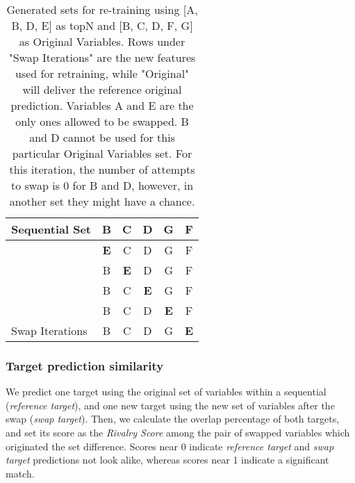 \begin{table}[!htbp]
{\begin{tabular}{l|c|c|c|c|c|}
\multicolumn{1}{|l|}{Sequential Set}                          & B                                  & C                                  & D                                  & G                                  & F                                  \\ \hline
\multicolumn{1}{|l|}{}                                  & \cellcolor{blue}\textbf{E} & \cellcolor[HTML]{F1F8F6}C          & \cellcolor[HTML]{F1F8F6}D          & \cellcolor[HTML]{F1F8F6}G          & \cellcolor[HTML]{F1F8F6}F          \\ \cline{2-6} 
\multicolumn{1}{|l|}{}                                  & B                                  & \cellcolor{blue}\textbf{E} & D                                  & G                                  & F                                  \\ \cline{2-6} 
\multicolumn{1}{|l|}{}                                  & \cellcolor[HTML]{F1F8F6}B          & \cellcolor[HTML]{F1F8F6}C          & \cellcolor{blue}\textbf{E} & \cellcolor[HTML]{F1F8F6}G          & \cellcolor[HTML]{F1F8F6}F          \\ \cline{2-6} 
\multicolumn{1}{|l|}{}                                  & B                                  & C                                  & D                                  & \cellcolor{blue}\textbf{E} & F                                  \\ \cline{2-6} 
\multicolumn{1}{|l|}{\multirow{-5}{*}{Swap Iterations}} & \cellcolor[HTML]{F1F8F6}B          & \cellcolor[HTML]{F1F8F6}C          & \cellcolor[HTML]{F1F8F6}D          & \cellcolor[HTML]{F1F8F6}G          & \cellcolor{blue}\textbf{E} \\ \hline
\end{tabular}%
}
\label{tbl:swap-example}
\caption{Generated sets for re-training using [A, B, D, E] as topN and [B, C, D, F, G] as Original Variables. Rows under "Swap Iterations" are the new features used for retraining, while "Original" will deliver the reference original prediction. Variables A and E are the only ones allowed to be swapped. B and D cannot be used for this particular Original Variables set. For this iteration, the number of attempts to swap is 0 for B and D, however, in another set they might have a chance.}
\end{table}

\subsubsection{Target prediction similarity}
We predict one target using the original set of variables within a sequential (\emph{reference target}), and one new target using the new set of variables after the swap (\emph{swap target}). Then, we calculate the overlap percentage of both targets, and set its score as the \emph{Rivalry Score} among the pair of swapped variables which originated the set difference. Scores near 0 indicate \emph{reference target} and \emph{swap target} predictions not look alike, whereas scores near 1 indicate a significant match.

